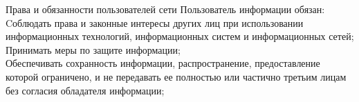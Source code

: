 \documentclass{beamer}
\begin{document}
\begin{frame}{Права и обязанности пользователей сети}
Пользователь информации обязан:\\
Cоблюдать права и законные интересы других лиц при использовании информационных технологий, информационных систем и информационных сетей;\\
Принимать меры по защите информации;\\
Обеспечивать сохранность информации, распространение, предоставление которой ограничено, и не передавать ее полностью или частично третьим лицам без согласия обладателя информации;\\
\end{frame}
\end{document}
